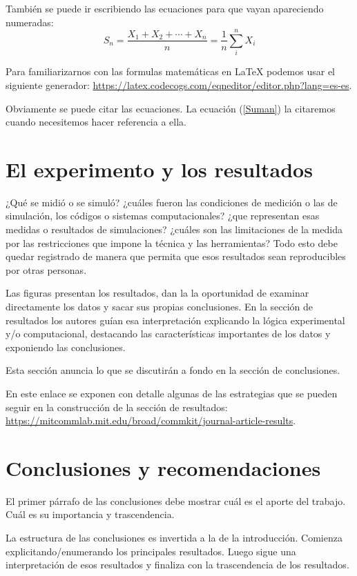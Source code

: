 \documentclass[spanish,notitlepage,letterpaper,11pt]{article} %
\begin{document}
También se puede ir escribiendo las ecuaciones para que vayan apareciendo numeradas:
\begin{equation}
  S_n = \frac{X_1 + X_2 + \cdots + X_n}{n} = \frac{1}{n}\sum_{i}^{n} X_i 
  \label{Suman}
\end{equation}

Para familiarizarnos con las formulas matemáticas en \LaTeX{} podemos usar el siguiente generador:  \url{https://latex.codecogs.com/eqneditor/editor.php?lang=es-es}. 

Obviamente se puede citar las ecuaciones.  La ecuación (\ref{Suman}) la citaremos cuando necesitemos hacer referencia a ella.


\section{El experimento y los resultados}
\label{Resultados}
¿Qué se midió o se simuló? ¿cuáles fueron las condiciones de medición o las de simulación, los códigos o sistemas computacionales? ¿que representan esas medidas o resultados de simulaciones? ¿cuáles son las limitaciones de la medida por las restricciones que impone la técnica y las herramientas? Todo esto debe quedar registrado de manera que permita que esos resultados sean reproducibles por otras personas.

Las figuras presentan los resultados, dan la la oportunidad de examinar directamente los datos y sacar sus propias conclusiones. En la sección de resultados los autores guían esa interpretación explicando la lógica experimental y/o computacional, destacando las características importantes de los datos y exponiendo las conclusiones.

Esta sección anuncia lo que se discutirán a fondo en la sección de conclusiones.

En este enlace se exponen con detalle algunas de las estrategias que se pueden seguir en la construcción de la sección de resultados:\\ 
 \url{https://mitcommlab.mit.edu/broad/commkit/journal-article-results}. 


\section{Conclusiones y recomendaciones}
\label{Conclusiones}
El primer párrafo de las conclusiones debe mostrar cuál es el aporte del trabajo. Cuál es su importancia y trascendencia. 

La estructura de las conclusiones es invertida a la de la introducción. Comienza explicitando/enumerando los principales resultados. Luego sigue una interpretación de esos resultados y finaliza con la trascendencia de los resultados.  
\end{document}
